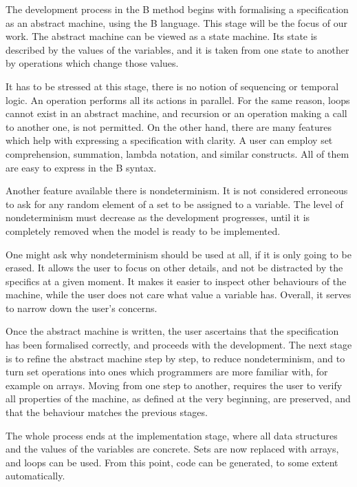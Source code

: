 \documentclass[12pt,journal,duplex]{IEEEtran}
\begin{document}
	The development process in the B method begins with formalising a specification as an abstract machine, using the B language. This stage will be the focus of our work. The abstract machine can be viewed as a state machine. Its state is described by the values of the variables, and it is taken from one state to another by operations which change those values.

	It has to be stressed at this stage, there is no notion of sequencing or temporal logic. An operation performs all its actions in parallel. For the same reason, loops cannot exist in an abstract machine, and recursion or an operation making a call to another one, is not permitted. On the other hand, there are many features which help with expressing a specification with clarity. A user can employ set comprehension, summation, lambda notation, and similar constructs. All of them are easy to express in the B syntax.

	Another feature available there is nondeterminism. It is not considered erroneous to ask for any random element of a set to be assigned to a variable. The level of nondeterminism must decrease as the development progresses, until it is completely removed when the model is ready to be implemented.

	One might ask why nondeterminism should be used at all, if it is only going to be erased. It allows the user to focus on other details, and not be distracted by the specifics at a given moment. It makes it easier to inspect other behaviours of the machine, while the user does not care what value a variable has. Overall, it serves to narrow down the user's concerns.

	Once the abstract machine is written, the user ascertains that the specification has been formalised correctly, and proceeds with the development. The next stage is to refine the abstract machine step by step, to reduce nondeterminism, and to turn set operations into ones which programmers are more familiar with, for example on arrays. Moving from one step to another, requires the user to verify all properties of the machine, as defined at the very beginning, are preserved, and that the behaviour matches the previous stages.

	The whole process ends at the implementation stage, where all data structures and the values of the variables are concrete. Sets are now replaced with arrays, and loops can be used. From this point, code can be generated, to some extent automatically.
\end{document}
